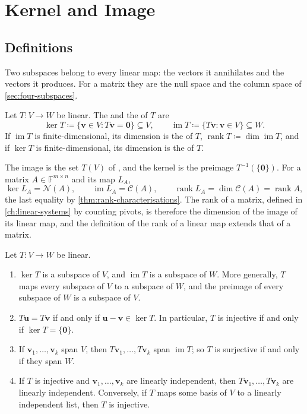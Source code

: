 \section{Kernel and Image}
\label{sec:kernel-image}

\subsection{Definitions}

Two subspaces belong to every linear map: the vectors it annihilates and the vectors it produces. For a matrix they are the null space and the column space of \cref{sec:four-subspaces}.

\begin{definition}
\label{def:kernel-image}
Let $T\colon V\to W$ be linear. The  and the  of $T$ are
\[
\ker T\coloneqq\{\mathbf v\in V: T\mathbf v=\mathbf 0\}\subseteq V,\qquad\operatorname{im}T\coloneqq\{T\mathbf v: \mathbf v\in V\}\subseteq W .
\]
If $\operatorname{im}T$ is finite-dimensional, its dimension is the  of $T$, $\operatorname{rank}T\coloneqq\dim\operatorname{im}T$, and if $\ker T$ is finite-dimensional, its dimension is the  of $T$.
\end{definition}

The image is the set $T(V)$ of , and the kernel is the preimage $T^{-1}(\{\mathbf 0\})$. For a matrix $A\in\mathbb F^{m\times n}$ and its map $L_A$,
\[
\ker L_A=\mathcal N(A),\qquad\operatorname{im}L_A=\mathcal C(A),\qquad\operatorname{rank}L_A=\dim\mathcal C(A)=\operatorname{rank}A,
\]
the last equality by \cref{thm:rank-characterisations}. The rank of a matrix, defined in \cref{ch:linear-systems} by counting pivots, is therefore the dimension of the image of its linear map, and the definition of the rank of a linear map extends that of a matrix.

\begin{proposition}
\label{prop:kernel-image}
Let $T\colon V\to W$ be linear.
\begin{enumerate}
\item $\ker T$ is a subspace of $V$, and $\operatorname{im}T$ is a subspace of $W$. More generally, $T$ maps every subspace of $V$ to a subspace of $W$, and the preimage of every subspace of $W$ is a subspace of $V$.
\item $T\mathbf u=T\mathbf v$ if and only if $\mathbf u-\mathbf v\in\ker T$. In particular, $T$ is injective if and only if $\ker T=\{\mathbf 0\}$.
\item If $\mathbf v_1,\ldots,\mathbf v_k$ span $V$, then $T\mathbf v_1,\ldots,T\mathbf v_k$ span $\operatorname{im}T$; so $T$ is surjective if and only if they span $W$.
\item If $T$ is injective and $\mathbf v_1,\ldots,\mathbf v_k$ are linearly independent, then $T\mathbf v_1,\ldots,T\mathbf v_k$ are linearly independent. Conversely, if $T$ maps some basis of $V$ to a linearly independent list, then $T$ is injective.
\end{enumerate}
\end{proposition}

